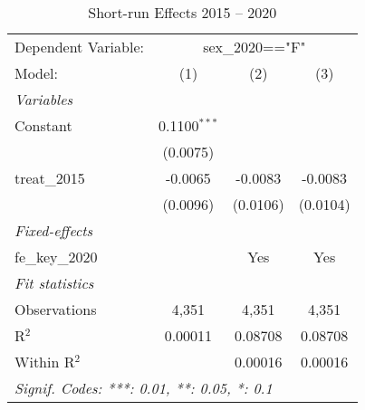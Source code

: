 
\begin{table}[htbp]
   \caption{Short-run Effects 2015 -- 2020}
   \centering
   \begin{tabular}{lccc}
      \tabularnewline \midrule \midrule
      Dependent Variable: & \multicolumn{3}{c}{sex\_2020=="F"}\\
      Model:          & (1)            & (2)      & (3)\\  
      \midrule
      \emph{Variables}\\
      Constant        & 0.1100$^{***}$ &          &   \\   
                      & (0.0075)       &          &   \\   
      treat\_2015     & -0.0065        & -0.0083  & -0.0083\\   
                      & (0.0096)       & (0.0106) & (0.0104)\\   
      \midrule
      \emph{Fixed-effects}\\
      fe\_key\_2020   &                & Yes      & Yes\\  
      \midrule
      \emph{Fit statistics}\\
      Observations    & 4,351          & 4,351    & 4,351\\  
      R$^2$           & 0.00011        & 0.08708  & 0.08708\\  
      Within R$^2$    &                & 0.00016  & 0.00016\\  
      \midrule \midrule
      \multicolumn{4}{l}{\emph{Signif. Codes: ***: 0.01, **: 0.05, *: 0.1}}\\
   \end{tabular}
\end{table}


